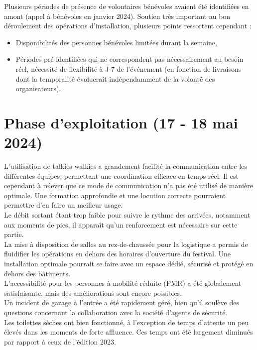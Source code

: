 \documentclass[12pt,a4paper]{report}
\begin{document}
Plusieurs périodes de présence de volontaires bénévoles avaient été identifiées en amont (appel à bénévoles en janvier 2024). Soutien très important au bon déroulement des opérations d'installation, plusieurs points ressortent cependant : 
\begin{itemize}
\item Disponibilités des personnes bénévoles limitées durant la semaine,
\item Périodes pré-identifiées qui ne correspondent pas nécessairement au besoin réel, nécessité de flexibilité à J-7 de l'événement (en fonction de livraisons dont la temporalité évoluerait indépendamment de la volonté des organisateurs).
\end{itemize}

\section{Phase d'exploitation (17 - 18 mai 2024)}

L'utilisation de talkies-walkies a grandement facilité la communication entre les différentes équipes, permettant une coordination efficace en temps réel. Il est cependant à relever que ce mode de communication n’a pas été utilisé de manière optimale. Une formation approfondie et une locution correcte pourraient permettre d’en faire un meilleur usage.\\


Le débit sortant étant trop faible pour suivre le rythme des arrivées, notamment aux moments de pics, il apparaît qu’un renforcement est nécessaire sur cette partie.\\

La mise à disposition de salles au rez-de-chaussée pour la logistique a permis de fluidifier les opérations en dehors des horaires d'ouverture du festival. Une installation optimale pourrait se faire avec un espace dédié, sécurisé et protégé en dehors des bâtiments.\\

L'accessibilité pour les personnes à mobilité réduite (PMR) a été globalement satisfaisante, mais des améliorations sont encore possibles.\\

Un incident de gazage à l'entrée a été rapidement géré, bien qu'il soulève des questions concernant la collaboration avec la société d'agents de sécurité.\\

Les toilettes sèches ont bien fonctionné, à l'exception de temps d’attente un peu élevés dans les moments de forte affluence. Ces temps ont été largement diminués par rapport à ceux de l’édition 2023.\\
\end{document}
